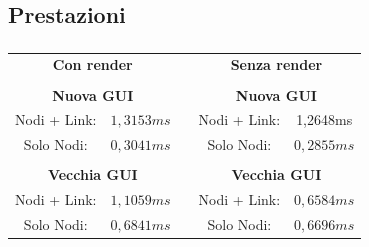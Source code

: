 \documentclass[%
]{beamer}
\begin{document}
    \subsection{Prestazioni}\label{subsec:benchmark}
    \begin{frame}
        \frametitle{\insertsection}
        \framesubtitle{\insertsubsection}
        \centering
        \begin{tabular}{ccccc}
            \multicolumn{2}{c}{\textbf{Con render}} &  & \multicolumn{2}{c}{\textbf{Senza render}} \\
             &  &  &  &  \\ \cline{1-2} \cline{4-5}
            \multicolumn{2}{|c|}{\textbf{Nuova GUI}} & \multicolumn{1}{c|}{} & \multicolumn{2}{c|}{\textbf{Nuova GUI}} \\ \cline{1-2} \cline{4-5}
            \multicolumn{1}{|c|}{Nodi + Link:} & \multicolumn{1}{c|}{$1,3153ms$} & \multicolumn{1}{c|}{} & \multicolumn{1}{c|}{Nodi + Link:} & \multicolumn{1}{c|}{1,2648ms} \\ \cline{1-2} \cline{4-5}
            \multicolumn{1}{|c|}{Solo Nodi:} & \multicolumn{1}{c|}{$0,3041ms$} & \multicolumn{1}{c|}{} & \multicolumn{1}{c|}{Solo Nodi:} & \multicolumn{1}{c|}{$0,2855ms$} \\ \cline{1-2} \cline{4-5}
             &  &  &  &  \\ \cline{1-2} \cline{4-5}
            \multicolumn{2}{|c|}{\textbf{Vecchia GUI}} & \multicolumn{1}{c|}{} & \multicolumn{2}{c|}{\textbf{Vecchia GUI}} \\ \cline{1-2} \cline{4-5}
            \multicolumn{1}{|c|}{Nodi + Link:} & \multicolumn{1}{c|}{$1,1059ms$} & \multicolumn{1}{c|}{} & \multicolumn{1}{c|}{Nodi + Link:} & \multicolumn{1}{c|}{$0,6584ms$} \\ \cline{1-2} \cline{4-5}
            \multicolumn{1}{|c|}{Solo Nodi:} & \multicolumn{1}{c|}{$0,6841ms$} & \multicolumn{1}{c|}{} & \multicolumn{1}{c|}{Solo Nodi:} & \multicolumn{1}{c|}{$0,6696ms$} \\ \cline{1-2} \cline{4-5}
        \end{tabular}
    \end{frame}
\end{document}
